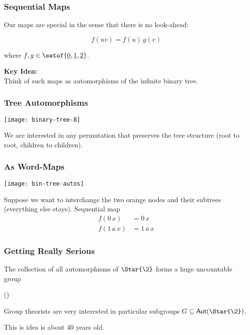 \documentclass[handout,10pt]{ksbeamer}
\let\emph=\alert
\def\Aut{\mathsf{Aut}}
\def\SS{\Star{\2}}
\def\F#1{\underline{#1}}
\begin{document}
\begin{frame}
\frametitle{Sequential Maps}

Our maps are special in the sense that there is no look-ahead:

%
$$
    f(uv) = f(u) \, g(v)
$$
%

where $f, g \in \setof{\F{0},\F{1},\F{2}}$. 
\vspace{5ex}

\textbf{Key Idea:}  \\[1ex]
Think of such maps as \emph{automorphisms} of the infinite binary tree. 

\end{frame}


\begin{frame}
\frametitle{Tree Automorphisms}

\hspace*{-10mm} 
\texttt{[image: binary-tree-8]}
\vspace{5ex} 

We are interested in any permutation that preserves the tree structure
(root to root, children to children).

\end{frame}

\begin{frame}
\frametitle{As Word-Maps}

\begin{center}
\texttt{[image: bin-tree-autos]}
\end{center}
\vspace{3ex} 


Suppose we want to interchange the two orange nodes 
and their subtrees (everything else stays).
Sequential map
% 
\begin{align*}
f(0\,x)  &= 0\,x \\
f(1\,a\,x) &= 1 \,\overline{a} \, x
\end{align*}
\end{frame}


\begin{frame}
\frametitle{Getting Really Serious}

The collection of all automorphisms of $\SS$ forms a huge uncountable group 
\vspace{1ex} 

\begin{mathyellowbox}
       \Aut(\SS)
\end{mathyellowbox}
\vspace{5ex} 

Group theorists are very interested in particular subgroups 
$G \subseteq \Aut(\SS)$. 
\vspace{5ex} 

This is idea is about 40 years old. 

\end{frame}
\end{document}
